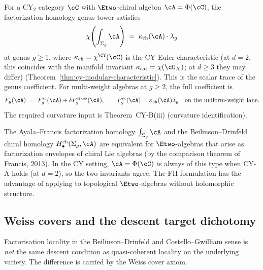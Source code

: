 \begin{proposition}
\label{prop:fh-genus-tower}
For a CY$_2$ category $\cC$ with $\Etwo$-chiral algebra
$\cA = \Phi(\cC)$, the factorization homology genus tower satisfies
\[
 \chi\!\left(\int_{\Sigma_g} \cA\right)
 \;=\;
 \kappa_{\mathrm{ch}}(\cA) \cdot \lambda_g
\]
at genus $g \geq 1$, where $\kappa_{\mathrm{ch}} = \chi^{\CY}(\cC)$
is the CY Euler characteristic (at $d = 2$, this coincides with
the manifold invariant $\kappa_{\mathrm{cat}} = \chi(\cO_X)$;
at $d \ge 3$ they may differ)
(Theorem~\textup{\ref{thm:cy-modular-characteristic}}). This is the
scalar trace of the genus coefficient.  For multi-weight algebras at
$g \geq 2$, the full coefficient is
\[
 F_g(\cA) \;=\; F_g^{\mathrm{sc}}(\cA) +
 \delta F_g^{\mathrm{cross}}(\cA),
 \qquad
 F_g^{\mathrm{sc}}(\cA)=\kappa_{\mathrm{ch}}(\cA)\lambda_g
 \quad\textup{on the uniform-weight lane}.
\]
The required curvature input is Theorem~CY-B(iii)
(curvature identification).
\end{proposition}

\begin{remark}
\label{rem:fh-vs-chiral}
The Ayala--Francis factorization homology $\int_{\Sigma_g} \cA$ and the
Beilinson--Drinfeld chiral homology $H^{\mathrm{ch}}_\bullet(\Sigma_g, \cA)$
are equivalent for $\Etwo$-algebras that arise as factorization envelopes
of chiral Lie algebras (by the comparison theorem of Francis, 2013).
In the CY setting, $\cA = \Phi(\cC)$ is always of this type when CY-A
holds (at $d = 2$), so the two invariants agree. The FH formulation has
the advantage of applying to topological $\Etwo$-algebras without
holomorphic structure.
\end{remark}

\subsection{Weiss covers and the descent target dichotomy}
\label{subsec:weiss-covers-descent-target}

Factorisation locality in the Beilinson--Drinfeld and Costello--Gwilliam sense is \emph{not} the same descent condition as quasi-coherent locality on the underlying variety. The difference is carried by the Weiss cover axiom.

